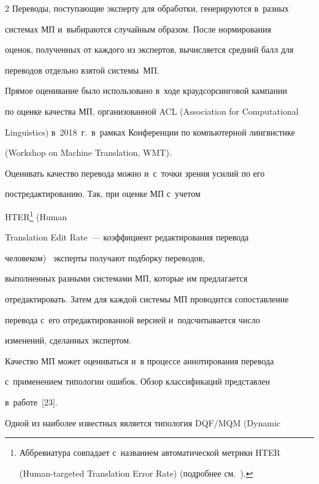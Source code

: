 \begin{multicols}{2}
Переводы, поступающие эксперту для обработки, генерируются в~разных 


системах МП и~выбираются случайным образом. После нормирования 


оценок, полученных от каждого из экспертов, вычисляется средний балл для 


переводов отдельно взятой системы~МП.





  


  Прямое оценивание было использовано в~ходе краудсорсинговой кампании 


по оценке качества МП, организованной ACL (Association for Computational 


Linguistics) в~2018~г.\ в~рамках Конференции по компьютерной лингвистике 


(Workshop on Machine Translation, WMT).


  


  Оценивать качество перевода можно и~с~точки зрения усилий по его 


постредактированию. Так, при оценке МП с~учетом 


HTER\footnote{Аббревиатура совпадает с~названием автоматической метрики HTER  


(Human-targeted Translation Error Rate) (подробнее см.~\cite[с.~25]{18-nur}).} (Human 


Translation Edit Rate~--- коэффициент редактирования перевода 


человеком)~\cite[с.~51--52]{10-nur} эксперты получают подборку переводов, 


выполненных разными системами МП, которые им предлагается 


отредактировать. Затем для каждой системы МП проводится сопоставление 


перевода с~его отредактированной версией и~подсчитывается число 


изменений, сделанных экспертом.


  


  Качество МП может оцениваться и~в процессе аннотирования перевода 


с~применением типологии ошибок. Обзор классификаций представлен 


в~работе~[23].


  


  Одной из наиболее известных является типология DQF/MQM (Dynamic 



\end{multicols}
